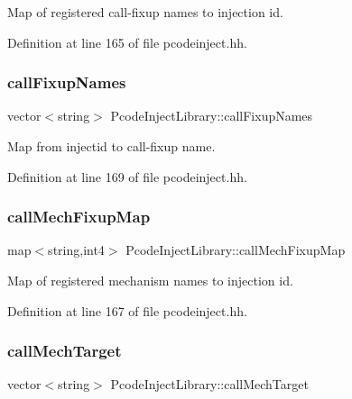 Map of registered call-\/fixup names to injection id. 



Definition at line 165 of file pcodeinject.\+hh.

\mbox{\label{class_pcode_inject_library_a6546a7f92bd290b988efe959e3fd84f6}} 
\subsubsection{\texorpdfstring{callFixupNames}{callFixupNames}}
{\footnotesize\ttfamily vector$<$string$>$ Pcode\+Inject\+Library\+::call\+Fixup\+Names\hspace{0.3cm}{\ttfamily [protected]}}



Map from injectid to call-\/fixup name. 



Definition at line 169 of file pcodeinject.\+hh.

\mbox{\label{class_pcode_inject_library_a5e60d3c9319a18387281404cb92503e3}} 
\subsubsection{\texorpdfstring{callMechFixupMap}{callMechFixupMap}}
{\footnotesize\ttfamily map$<$string,int4$>$ Pcode\+Inject\+Library\+::call\+Mech\+Fixup\+Map\hspace{0.3cm}{\ttfamily [protected]}}



Map of registered mechanism names to injection id. 



Definition at line 167 of file pcodeinject.\+hh.

\mbox{\label{class_pcode_inject_library_a082b2a2b26f725dc6bc43224e528664d}} 
\subsubsection{\texorpdfstring{callMechTarget}{callMechTarget}}
{\footnotesize\ttfamily vector$<$string$>$ Pcode\+Inject\+Library\+::call\+Mech\+Target\hspace{0.3cm}{\ttfamily [protected]}}



